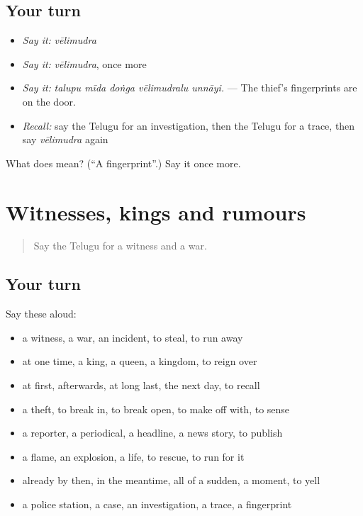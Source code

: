 \subsection*{Your turn}
\begin{itemize}
\raggedright
  \item \emph{Say it:} \emph{vēlimudra}
  \item \emph{Say it:} \emph{vēlimudra}, once more
  \item \emph{Say it:} \emph{talupu mīda doṅga vēlimudralu unnāyi.} — The thief's fingerprints are on the door.
  \item \emph{Recall:} say the Telugu for an investigation, then the Telugu for a trace, then say \emph{vēlimudra} again
\end{itemize}

\begin{tcolorbox}[breakable,colback=teal!4,colframe=teal!35!black,title={Before you move on}]
What does  mean? (\textquotedblleft{}A fingerprint\textquotedblright{}.) Say it once more.
\end{tcolorbox}
\section[(dialogue)]{Witnesses, kings and rumours}

\label{lesson:TE-R333-review-326-333}



\begin{quote}
Say the Telugu for a witness and a war.
\end{quote}

\subsection*{Your turn}
Say these aloud:

\begin{itemize}
\raggedright
  \item a witness, a war, an incident, to steal, to run away
  \item at one time, a king, a queen, a kingdom, to reign over
  \item at first, afterwards, at long last, the next day, to recall
  \item a theft, to break in, to break open, to make off with, to sense
  \item a reporter, a periodical, a headline, a news story, to publish
  \item a flame, an explosion, a life, to rescue, to run for it
  \item already by then, in the meantime, all of a sudden, a moment, to yell
  \item a police station, a case, an investigation, a trace, a fingerprint
\end{itemize}

